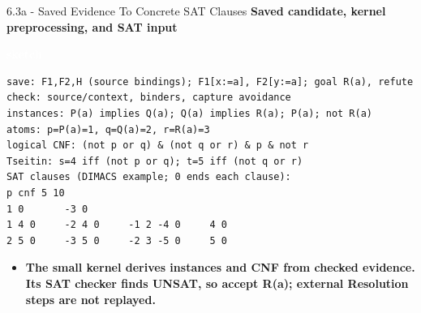 \documentclass[aspectratio=169,11pt]{beamer}
\newcommand{\statusbadge}[2]{\colorbox{#1}{\textcolor{white}{\strut\scriptsize\sffamily\bfseries #2}}}
\newcommand{\badgeSketch}{\statusbadge{orange!75!black}{sketch}}
\begin{document}
\begin{frame}[fragile,t]{6.3a - Saved Evidence To Concrete SAT Clauses}
\smallskip
\textbf{Saved candidate, kernel preprocessing, and SAT input}~\badgeSketch
\begin{lstlisting}[language={},basicstyle=\ttfamily\footnotesize]
save: F1,F2,H (source bindings); F1[x:=a], F2[y:=a]; goal R(a), refute
check: source/context, binders, capture avoidance
instances: P(a) implies Q(a); Q(a) implies R(a); P(a); not R(a)
atoms: p=P(a)=1, q=Q(a)=2, r=R(a)=3
logical CNF: (not p or q) & (not q or r) & p & not r
Tseitin: s=4 iff (not p or q); t=5 iff (not q or r)
SAT clauses (DIMACS example; 0 ends each clause):
p cnf 5 10
1 0       -3 0
1 4 0     -2 4 0     -1 2 -4 0     4 0
2 5 0     -3 5 0     -2 3 -5 0     5 0
\end{lstlisting}
\begin{itemize}
\setlength{\itemsep}{1pt}
\setlength{\parsep}{0pt}
\setlength{\parskip}{0pt}
\item \textcolor{blue!55!black}{\textbf{The small kernel derives instances and CNF from checked evidence. Its SAT checker finds UNSAT, so accept R(a); external Resolution steps are not replayed.}}
\end{itemize}
\end{frame}
\end{document}
